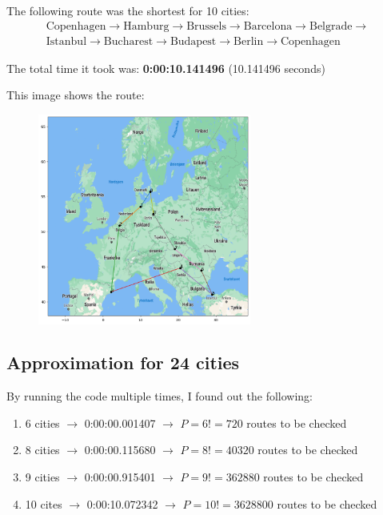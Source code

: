 \documentclass{article}
\begin{document}
    The following route was the shortest for 10 cities: 
    \[
    \begin{aligned}
        \text{Copenhagen} \to \text{Hamburg} \to \text{Brussels} \to \text{Barcelona} \to \text{Belgrade} \to\\
        \text{Istanbul} \to \text{Bucharest} \to \text{Budapest} \to \text{Berlin} \to \text{Copenhagen}
    \end{aligned}
    \]

    The total time it took was: \textbf{0:00:10.141496} (10.141496 seconds)

    This image shows the route:

    \begin{figure}[h!]
        \includegraphics[width=7cm]{images/exhaustive_search_result_10_cities.png}
        \centering
    \end{figure}

    \newpage

    \subsection{Approximation for 24 cities}

    By running the code multiple times, I found out the following: 

    \begin{enumerate}
        \item 6 cities $\to$ 0:00:00.001407 $\to$ $P = 6! = 720$ routes to be checked 
        \item 8 cities $\to$ 0:00:00.115680 $\to$ $P = 8! = 40320$ routes to be checked 
        \item 9 cities $\to$ 0:00:00.915401 $\to$ $P = 9! = 362880$ routes to be checked 
        \item 10 cites $\to$ 0:00:10.072342 $\to$ $P = 10! = 3628800$ routes to be checked 
    \end{enumerate}
\end{document}
